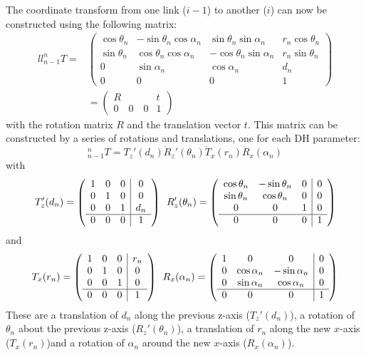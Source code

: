 The coordinate transform from one link ($ i-1$) to another ($i$) can now be constructed  using the following matrix:
\begin{eqnarray}{ll}
\nonumber
_{n-1}^nT=&
\left(
\begin{array}{ccc|c}
\cos \theta_n & -\sin \theta_n \cos\alpha_n & \sin\theta_n \sin\alpha_n & r_n \cos\theta_n\\
\sin \theta_n & \cos\theta_n \cos\alpha_n & -\cos\theta_n\sin\alpha_n & r_n \sin\theta_n\\
0 & \sin\alpha_n & \cos\alpha_n & d_n\\
\hline
0 & 0 & 0 & 1
\end{array}
\right)\\
&=
\left(
\begin{array}{c|c}
R & t\\
\hline
0 \quad 0 \quad 0 & 1
\end{array}
\right)
\end{eqnarray}
with the rotation matrix $R$ and the translation vector $t$. This matrix can be constructed by a series of rotations and translations, one for each DH parameter:
\begin{equation}
_{n-1}^nT=T_z'(d_n)\dot R_z'(\theta_n) \dot T_x(r_n) \dot R_x(\alpha_n)
\end{equation}
with
\begin{equation}
T_z'(d_n)=
\left(
\begin{array}{ccc|c}
1 & 0 & 0 & 0\\
0 & 1 & 0 & 0\\
0 & 0 & 1 & d_n\\
\hline
0 & 0 & 0 & 1
\end{array}
\right)
\enskip
R_z'(\theta_n)=\left(
\begin{array}{ccc|c}
\cos\theta_n & -\sin\theta_n & 0 & 0\\
\sin\theta_n & \cos\theta_n & 0 & 0\\
0 & 0 & 1 & 0\\
\hline
0 & 0 & 0 & 1
\end{array}
\right)
\end{equation}
and
\begin{equation}
T_x(r_n)=
\left(
\begin{array}{ccc|c}
1 & 0 & 0 & r_n\\
0 & 1 & 0 & 0\\
0 & 0 & 1 & 0\\
\hline
0 & 0 & 0 & 1
\end{array}
\right)
\enskip
R_x(\alpha_n)=\left(
\begin{array}{ccc|c}
1 & 0 & 0 & 0\\
0 & \cos\alpha_n & -\sin\alpha_n & 0\\
0 & \sin\alpha_n & \cos\alpha_n & 0\\
\hline
0 & 0 & 0 & 1
\end{array}
\right)
\end{equation} 
These are a translation of $d_n$ along the previous z-axis ($T_z'(d_n)$), a rotation of $\theta_n$ about the previous z-axis ($R_z'(\theta_n)$), a translation of $r_n$ along the new $x$-axis ($T_x(r_n)$)and a rotation of $\alpha_n$ around the new $x$-axis ($R_x(\alpha_n)$).

